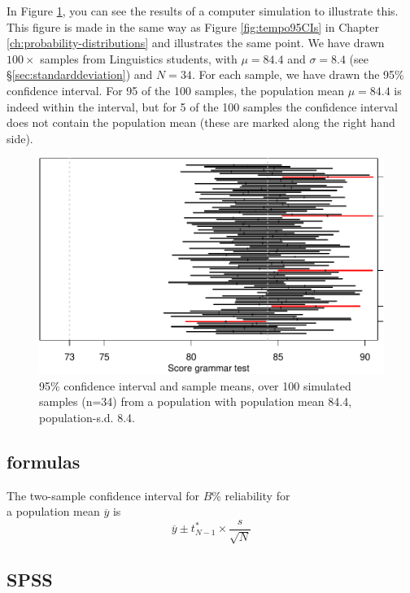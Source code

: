 \documentclass[
]{book}
\begin{document}
In Figure \ref{fig:gramm2013CIs}, you can see the results of
a computer simulation to illustrate this. This figure is made in the same way as Figure
\ref{fig:tempo95CIs} in Chapter \ref{ch:probability-distributions} and
illustrates the same point. We have drawn \(100\times\) samples from Linguistics students,
with \(\mu=84.4\) and \(\sigma=8.4\) (see §\ref{sec:standarddeviation}) and \(N=34\).
For each sample, we have drawn the 95\%
confidence interval. For 95 of the 100 samples, the population mean \(\mu=84.4\)
is indeed within the interval, but for 5 of the 100 samples the confidence interval does not contain the population mean (these are marked along the right hand side).

\begin{figure}
\centering
\includegraphics{QMS-EN_files/figure-latex/gramm2013CIs-1.pdf}
\caption{\label{fig:gramm2013CIs}95\% confidence interval and sample means, over 100 simulated samples (n=34) from a population with population mean 84.4, population-s.d. 8.4.}
\end{figure}

\hypertarget{sec:formulas13-2}{%
\subsection{formulas}\label{sec:formulas13-2}}

The two-sample confidence interval for \(B\)\% reliability for\\
a population mean \(\overline{y}\) is
\begin{equation}
    \overline{y} \pm t^*_{N-1} \times \frac{s}{\sqrt{N}}
  \label{eq:t-onesampleCI}
\end{equation}

\hypertarget{spss-11}{%
\subsection{SPSS}\label{spss-11}}
\end{document}
